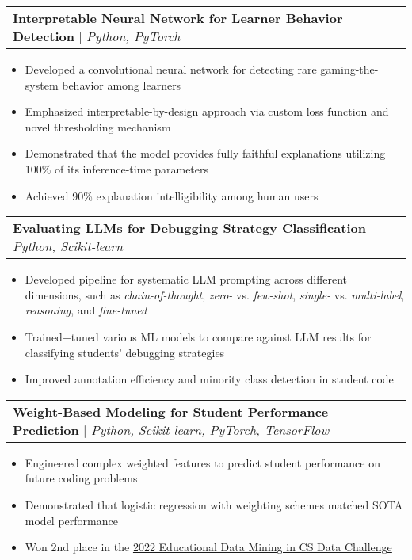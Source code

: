 \documentclass[letterpaper,11pt]{article}
\makeatletter
\newcommand{\resumeItem}[1]{
  \item\small{
    {#1 \vspace{-2pt}}
  }
}
\newcommand{\resumeProjectHeading}[2]{
    \item
    \begin{tabular*}{0.97\textwidth}{l@{\extracolsep{\fill}}r}
      \small#1 & #2 \\
    \end{tabular*}\vspace{-7pt}
}
\newcommand{\resumeItemListStart}{\begin{itemize}}
\newcommand{\resumeItemListEnd}{\end{itemize}\vspace{-5pt}}
\makeatother
\begin{document}
      \resumeProjectHeading
          {\textbf{Interpretable Neural Network for Learner Behavior Detection} $|$ \emph{Python, PyTorch}}{}%
          \resumeItemListStart
            \resumeItem{Developed a convolutional neural network for detecting rare gaming-the-system behavior among learners}
            \resumeItem{Emphasized interpretable-by-design approach via custom loss function and novel thresholding mechanism}
            \resumeItem{Demonstrated that the model provides fully faithful explanations utilizing 100\% of its inference-time parameters}
            \resumeItem{Achieved 90\% explanation intelligibility among human users}
          \resumeItemListEnd

      \resumeProjectHeading
          {\textbf{Evaluating LLMs for Debugging Strategy Classification} $|$ \emph{Python, Scikit-learn}}{}
          \resumeItemListStart
            \resumeItem{Developed pipeline for systematic LLM prompting across different dimensions, such as \emph{chain-of-thought}, \emph{zero-} vs. \emph{few-shot}, \emph{single-} vs. \emph{multi-label}, \emph{reasoning}, and \emph{fine-tuned}}
            \resumeItem{Trained+tuned various ML models to compare against LLM results for classifying students' debugging strategies}
            \resumeItem{Improved annotation efficiency and minority class detection in student code}
          \resumeItemListEnd

      \resumeProjectHeading
          {\textbf{Weight-Based Modeling for Student Performance Prediction} $|$ \emph{Python, Scikit-learn, PyTorch, TensorFlow}}{}
          \resumeItemListStart
            \resumeItem{Engineered complex weighted features to predict student performance on future coding problems}
            \resumeItem{Demonstrated that logistic regression with weighting schemes matched SOTA model performance}
            \resumeItem{Won 2nd place in the \href{https://sites.google.com/ncsu.edu/csedm-dc-2021/home}{2022 Educational Data Mining in CS Data Challenge}}
          \resumeItemListEnd
\end{document}
